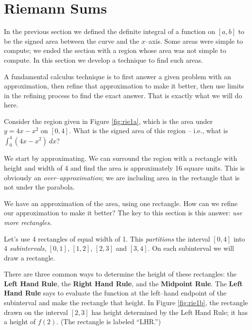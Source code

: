 \section{Riemann Sums}\label{sec:riemann}

In the previous section we defined the definite integral of a function on $[a,b]$ to be the signed area between the curve and the $x$--axis. Some areas were simple to compute; we ended the section with a region whose area was not simple to compute. In this section we develop a technique to find such areas.

A fundamental calculus technique is to first answer a given problem with an approximation, then refine that approximation to make it better, then use limits in the refining process to find the exact answer. That is exactly what we will do here.

Consider the region given in Figure \ref{fig:rie1a}, which is the area under $y=4x-x^2$ on $[0,4]$. What is the signed area of this region -- i.e., what is $\int_0^4(4x-x^2)\ dx$?


We start by approximating. We can surround the region with a rectangle with height and width of 4 and find the area is approximately 16 square units. This is obviously an \textit{over--approximation}; we are including area in the rectangle that is not under the parabola. 


We have an approximation of the area, using one rectangle. How can we refine our approximation to make it better? The key to this section is this answer: \textit{use more rectangles.}

Let's use 4 rectangles of equal width of 1. This \textit{partitions} the interval $[0,4]$ into 4 \textit{subintervals}, $[0,1]$, $[1,2]$, $[2,3]$ and $[3,4]$. On each subinterval we will draw a rectangle.

There are three common ways to determine the height of these rectangles: the \textbf{Left Hand Rule}, the \textbf{Right Hand Rule}, and the \textbf{Midpoint Rule}. The \textbf{Left Hand Rule} says to evaluate the function at the left--hand endpoint of the subinterval and make the rectangle that height. In Figure \ref{fig:rie1b}, the rectangle drawn on the interval $[2,3]$ has height determined by the Left Hand Rule; it has a height of $f(2)$. (The rectangle is labeled ``LHR.'')

